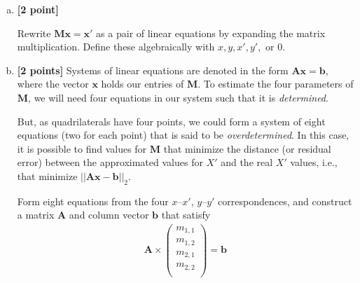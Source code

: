 \begin{enumerate}[(a)]
\item \textbf{[2 point]} 
\begin{tcolorbox}[colback=orange!5!white,colframe=orange!75!black]
Rewrite $\bm{M}\bm{x} = \bm{x'}$ as a pair of linear equations by expanding the matrix multiplication. Define these algebraically with $x, y, x', y',$ or $0$.
\end{tcolorbox}


\pagebreak
\item \textbf{[2 points]}
Systems of linear equations are denoted in the form $\bm{A}\bm{x} = \bm{b}$, where the vector $\bm{x}$ holds our entries of $\bm{M}$. 
To estimate the four parameters of $\bm{M}$, we will need four equations in our system such that it is \emph{determined}. 

But, as quadrilaterals have four points, we could form a system of eight equations (two for each point) that is said to be \emph{overdetermined}. In this case, it is possible to find values for $\bm{M}$ that minimize the distance (or residual error) between the approximated values for $X'$ and the real $X'$ values, i.e., that minimize $||\bm{A}\bm{x} - \bm{b}||_2$.

Form eight equations from the four $x$--$x'$, $y$--$y'$ correspondences, and construct a matrix $\bm{A}$ and column vector $\bm{b}$ that satisfy
\begin{align*}
    \bm{A} \times \begin{pmatrix} m_{1,1} \\ m_{1,2} \\ m_{2,1} \\ m_{2,2} \\ \end{pmatrix} = \bm{b}
\end{align*}


\end{enumerate}
